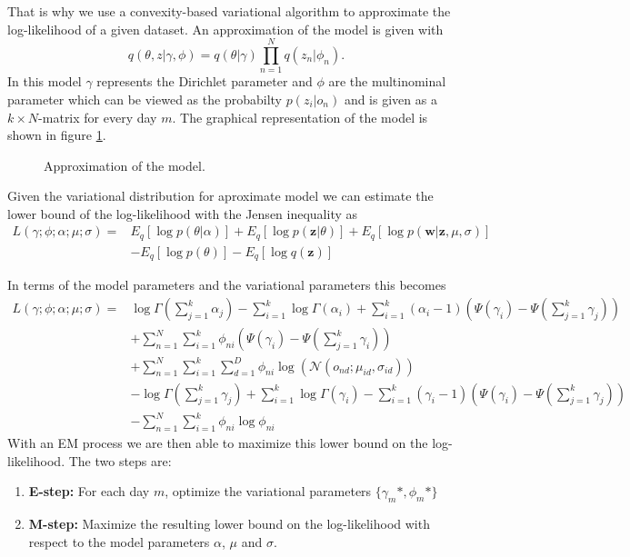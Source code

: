 \documentclass[a4paper,fleqn]{article}
\begin{document}
That is why we use a convexity-based variational algorithm to approximate the log-likelihood of a given dataset. 
An approximation of the model is given with 
  \begin{equation}
   q(\theta,z|\gamma,\phi) = q(\theta|\gamma) \prod_{n=1}^N q(z_n|\phi_n).
  \end{equation}
In this model $\gamma$ represents the Dirichlet parameter and $\phi$ are the multinominal parameter which can be viewed as the probabilty $p(z_i|o_n)$ and is given as a $k \times N$-matrix for every day $m$. The graphical representation of the model is shown in figure \ref{fig:ModelApprox}.
  
 
\begin{figure}[h!]
\centering
\def\svgwidth{0.4\textwidth}

\caption{Approximation of the model.}
\label{fig:ModelApprox}
\end{figure}
 
  
  
  
  Given the variational distribution for aproximate model we can estimate the lower bound of the log-likelihood with the Jensen inequality as
  \begin{equation}
   \begin{split}
    L(\gamma;\phi;\alpha;\mu;\sigma) =& E_q[\log p(\theta|\alpha)] + E_q[\log p(\textbf{z}|\theta)] + E_q[\log p(\textbf{w}|\textbf{z},\mu,\sigma)] \\
   & -E_q[\log p(\theta)] - E_q[\log q(\textbf{z})]
   \end{split}
  \end{equation}

In terms of the model parameters and the variational parameters this becomes
\begin{equation}
  \begin{split}
 L(\gamma;\phi;\alpha;\mu;\sigma) =& \log \Gamma (\sum_{j=1}^k \alpha_j) - \sum_{i=1}^k \log \Gamma(\alpha_i) + \sum_{i=1}^k (\alpha_i-1)(\Psi(\gamma_i)-\Psi(\sum_{j=1}^k \gamma_j)) \\
 & + \sum_{n=1}^N \sum_{i=1}^k \phi_{ni} (\Psi(\gamma_i)-\Psi(\sum_{j=1}^k \gamma_i)) \\
  & + \sum_{n=1}^N \sum_{i=1}^k \sum_{d=1}^D \phi_{ni} \log( \mathcal{N}(o_{nd};\mu_{id},\sigma_{id})) \\
  & - \log \Gamma (\sum_{j=1}^k \gamma_j) + \sum_{i=1}^k \log \Gamma (\gamma_i) - \sum_{i=1}^k (\gamma_i -1)(\Psi(\gamma_i)-\Psi(\sum_{j=1}^k \gamma_j)) \\
 & - \sum_{n=1}^N \sum_{i=1}^k \phi_{ni} \log \phi_{ni}
  \end{split}
  \label{eq:likeli}
\end{equation}
With an EM process we are then able to maximize this lower bound on the log-likelihood. The two steps are:
  \begin{enumerate}
   \item \textbf{E-step:} For each day $m$, optimize the variational parameters $\{ \gamma_{m}*,\phi_{m}* \}$
   \item \textbf{M-step:} Maximize the resulting lower bound on the log-likelihood with respect to the model parameters $\alpha$, $\mu$ and $\sigma$.
  \end{enumerate}
  
\end{document}
